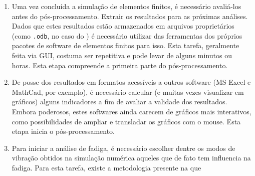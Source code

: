 \begin{enumerate}[label=(\arabic*)]
    \item Uma vez concluída a simulação de elementos finitos, é necessário avaliá-los antes do pós-processamento. Extrair os resultados para as próximas análises. Dados que estes resultados estão armazenados em arquivos proprietários (como \texttt{.odb}, no caso do \abaqus) é necessário utilizar das ferramentas dos próprios pacotes de software de elementos finitos para isso. Esta tarefa, geralmente feita via GUI, costuma ser repetitiva e pode levar de alguns minutos ou horas. Esta etapa compreende a primeira parte do pós-processamento.
    \item De posse dos resultados em formatos acessíveis a outros software (MS Excel e MathCad, por exemplo), é necessário calcular (e muitas vezes visualizar em gráficos) alguns indicadores a fim de avaliar a validade dos resultados. Embora poderosos, estes softwares ainda carecem de gráficos mais interativos, como possibilidades de ampliar e transladar os gráficos com o mouse. Esta etapa inicia o pós-processamento.
    \item Para iniciar a análise de fadiga, é necessário escolher dentre os modos de vibração obtidos na simulação numérica aqueles que de fato tem influencia na fadiga. Para esta tarefa, existe a metodologia presente na  que
\end{enumerate}